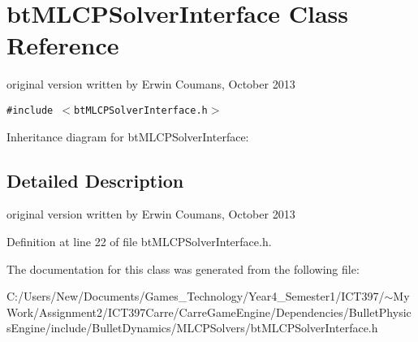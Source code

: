 \hypertarget{classbt_m_l_c_p_solver_interface}{
\section{btMLCPSolverInterface Class Reference}
\label{classbt_m_l_c_p_solver_interface}
}
original version written by Erwin Coumans, October 2013  


{\tt \#include $<$btMLCPSolverInterface.h$>$}

Inheritance diagram for btMLCPSolverInterface:

\subsection{Detailed Description}
original version written by Erwin Coumans, October 2013 

Definition at line 22 of file btMLCPSolverInterface.h.

The documentation for this class was generated from the following file:\begin{CompactItemize}
\item 
C:/Users/New/Documents/Games\_\-Technology/Year4\_\-Semester1/ICT397/$\sim$My Work/Assignment2/ICT397Carre/CarreGameEngine/Dependencies/BulletPhysicsEngine/include/BulletDynamics/MLCPSolvers/btMLCPSolverInterface.h\end{CompactItemize}

